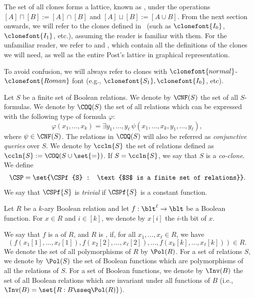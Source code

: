 \documentclass[11pt]{article}
\begin{document}
\begin{remark}
    \label{rk:post_lattice}
    The set of all clones forms a lattice, known as
    ,
    under the operations
    $[A] \sqcap [B] := [A] \cap [B]$
    and
    $[A] \sqcup [B] := [A \cup B]$.
    From the next section onwards,
    we will refer to the clones defined in~\cite{playing_one}
    (such as $\clonefont{I_0}$, $\clonefont{I_1}$, etc.),
    assuming the reader is familiar with them.
    For the unfamiliar reader, we refer to  and 
    ,
    which contain all the definitions of the clones we will need,
    as well as the entire Post's lattice in graphical representation.
    
    To avoid confusion, we will always refer to clones with
    $\clonefont{normal}$-$\clonefont{Roman}$ font (e.g.,
    $\clonefont{S_1}, \clonefont{I_0}$, etc).
\end{remark}

Let $S$ be a finite set of Boolean relations.
We denote by $\CNF(S)$ the set of all $S$-formulas.
We denote by $\COQ(S)$ 
the set of all relations which can be expressed
with the following type of formula $\varphi$:
\begin{equation*}
    \varphi(x_1,\dots,x_k) = \exists y_1,\dots,y_\ell
    \,
    \psi(x_1,\dots,x_k,y_1,\dots,y_\ell),
\end{equation*}
where $\psi \in \CNF(S)$.
The relations in $\COQ(S)$ will also be referred as \emph{conjunctive
queries} over $S$.
We denote by $\ccln{S}$ the set of relations
defined as
$\ccln{S} := \COQ(S \cup \set{=})$.
If $S = \ccln{S}$, we say that $S$ is a \emph{co-clone}.
We define 
$$\CSP = \set{\CSPf{S} : \text{$S$ is a finite set of relations}}.$$
We say that $\CSPf{S}$ is \emph{trivial}
if $\CSPf{S}$ is a constant function.


Let $R$ be a $k$-ary Boolean relation 
and
let $f : \blt^\ell \to \blt$ be a Boolean function.
For $x \in R$ and $i \in [k]$, we denote by $x[i]$
the $i$-th bit of $x$.
\begin{definition}
    \label{def:polymorphism}
    We say that $f$ is a
     of $R$,
    and $R$ is 
    ,
    if, for all $x_1, \dots, x_\ell \in R$, we have
    \begin{equation*}
        (
            f(x_1[1],\dots,x_{\ell}[1]),
            f(x_2[2],\dots,x_{\ell}[2]),
            \dots,
            f(x_k[k],\dots,x_{\ell}[k])
        )
        \in
        R.
    \end{equation*}
    We denote the set of all polymorphisms of $R$ by $\Pol(R)$.
    For a set of relations $S$,
    we denote by $\Pol(S)$ the set of Boolean functions
    which are polymorphisms of all the relations of $S$.
    For a set of Boolean functions, we denote by
    $\Inv(B)$ the set of all Boolean relations which are invariant
    under all functions of $B$ (i.e.,
    $\Inv(B) = \set{R : B \sseq \Pol(R)}$).
\end{definition}
\end{document}
